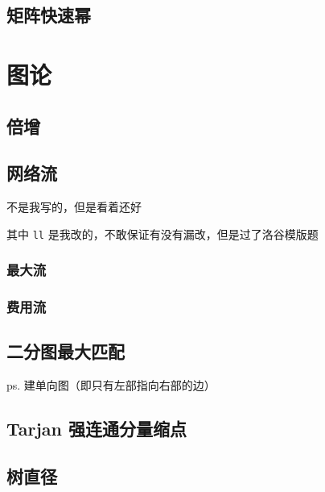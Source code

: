 \documentclass{article}
\begin{document}
\subsection{矩阵快速幂} %


\section{图论}

\subsection{倍增}



\subsection{网络流}

不是我写的，但是看着还好

其中 \lstinline{ll} 是我改的，不敢保证有没有漏改，但是过了洛谷模版题

\subsubsection{最大流}



\subsubsection{费用流}



\subsection{二分图最大匹配}

ps. 建单向图（即只有左部指向右部的边）



\subsection{Tarjan 强连通分量缩点}



\subsection{树直径}
\end{document}

